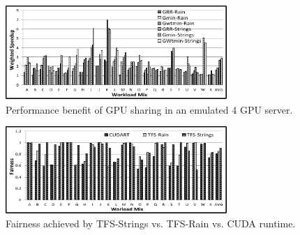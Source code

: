 \begin{figure}[h]
\centering
\includegraphics[width=0.75\textwidth,height=\textheight,keepaspectratio]{figures/strings_exp2.pdf}
\caption{Performance benefit of GPU sharing in an emulated 4 GPU server. }
\label{fig:strings_exp2}
\end{figure}
\begin{figure}[h]
\centering
\includegraphics[width=0.75\textwidth,height=\textheight,keepaspectratio]{figures/strings_exp3.pdf}
\caption{Fairness achieved by TFS-Strings vs. TFS-Rain vs. CUDA runtime. }
\label{fig:strings_exp3}
\end{figure}

